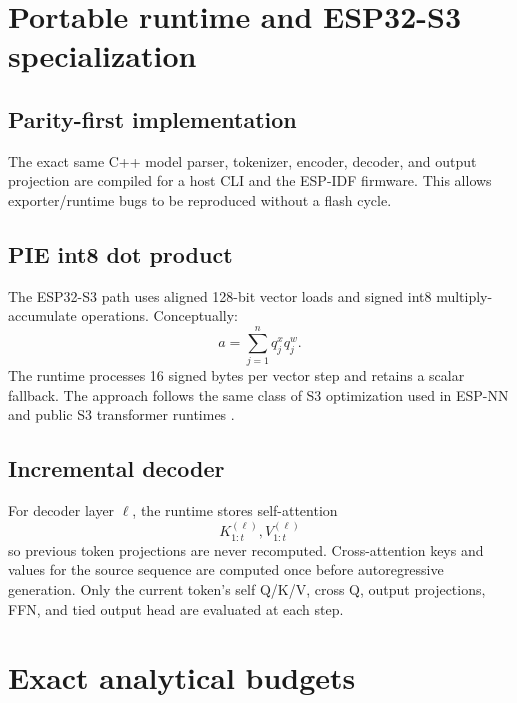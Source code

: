 \documentclass{article}
\begin{document}
\section{Portable runtime and ESP32-S3 specialization}
\subsection{Parity-first implementation}
The exact same C++ model parser, tokenizer, encoder, decoder, and output projection are compiled for a host CLI and the ESP-IDF firmware. This allows exporter/runtime bugs to be reproduced without a flash cycle.

\subsection{PIE int8 dot product}
The ESP32-S3 path uses aligned 128-bit vector loads and signed int8 multiply-accumulate operations. Conceptually:
\begin{equation}
a=\sum_{j=1}^{n}q^x_jq^w_j.
\end{equation}
The runtime processes 16 signed bytes per vector step and retains a scalar fallback. The approach follows the same class of S3 optimization used in ESP-NN and public S3 transformer runtimes \citep{espressif_espnn,dory2026esp32llm}.

\subsection{Incremental decoder}
For decoder layer $\ell$, the runtime stores self-attention
\begin{equation}
K^{(\ell)}_{1:t},V^{(\ell)}_{1:t}
\end{equation}
so previous token projections are never recomputed. Cross-attention keys and values for the source sequence are computed once before autoregressive generation. Only the current token's self Q/K/V, cross Q, output projections, FFN, and tied output head are evaluated at each step.

\section{Exact analytical budgets}
\end{document}
